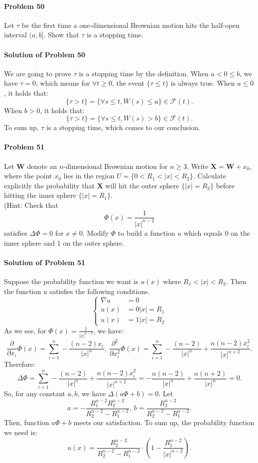 \documentclass{article}
\begin{document}
\paragraph{Problem 50} Let $\tau$ be the first time a one-dimensional Brownian motion hits the half-open interval $(a,b]$. Show that $\tau$ is a stopping time. 

\paragraph{Solution of Problem 50} We are going to prove $\tau$ is a stopping time by the definition. When $a<0\leqslant b$, we have $\tau=0$, which means for $\forall t \geqslant 0$, the event $\{\tau\leqslant t\}$ is always true. When $a\leqslant 0$, it holds that:
\[\{\tau> t\} = \{\forall s\leqslant t, W(s)\leqslant a\}\in \mathcal F(t).\]
When $b>0$, it holds that:
\[\{\tau> t\} = \{\forall s\leqslant t, W(s)>b\}\in \mathcal F(t).\]
To sum up, $\tau$ is a stopping time, which comes to our conclusion.

\paragraph{Problem 51} Let $\mathbf{W}$ denote an $n$-dimensional Brownian motion for $n\geqslant 3$. Write $\mathbf{X}=\mathbf{W}+x_0$, where the point $x_0$ lies in the region $U=\{0<R_1<|x|<R_2\}$. Calculate explicitly the probability that $\mathbf{X}$ will hit the outer sphere $\{|x|=R_2\}$ before hitting the inner sphere $\{|x|=R_1\}$. \\
(Hint: Check that
\[\Phi(x)=\frac{1}{|x|^{n-2}}\]
satisfies $\Delta\Phi=0$ for $x\neq 0$. Modify $\Phi$ to build a function $u$ which equals 0 on the inner sphere and 1 on the outer sphere. 

\paragraph{Solution of Problem 51} Suppose the probability function we want is $u(x)$ where $R_1<|x|<R_2$. Then the function $u$ satisfies the following conditions.
\begin{equation*}
\begin{cases}
\nabla u &= 0\\
u(x) &= 0 \mbox{$|x|=R_1$}\\
u(x) &= 1 \mbox{$|x|=R_2$}
\end{cases}    
\end{equation*}
As we see, for $\Phi(x)=\frac{1}{|x|^{n-2}}$, we have:
\[\frac{\partial}{\partial x_i}\Phi(x) =\sum_{i=1}^{n}-\frac{(n-2)x_i}{|x|^n},~\frac{\partial^2}{\partial x_i^2}\Phi(x) =\sum_{i=1}^{n}-\frac{(n-2)}{|x|^n}+\frac{n(n-2)x_i^2}{|x|^{n+2}}.\]
Therefore:
\[\Delta\Phi = \sum_{i=1}^{n}-\frac{(n-2)}{|x|^n}+\frac{n(n-2)x_i^2}{|x|^{n+2}} = -\frac{n(n-2)}{|x|^n}+\frac{n(n+2)}{|x|^n}=0.\]
So, for any constant $a,b$, we have $\Delta(a\Phi+b)=0$. Let 
\[a = -\frac{R_1^{n-2}R_2^{n-2}}{R_2^{n-2}-R_1^{n-2}},~b=\frac{R_2^{n-2}}{R_2^{n-2}-R_1^{n-2}}.\]
Then, function $a\Phi+b$ meets our satisfaction. To sum up, the probability function we need is:
\[u(x)=\frac{R_2^{n-2}}{R_2^{n-2}-R_1^{n-2}}\cdot\left(1-\frac{R_1^{n-2}}{|x|^{n-2}}\right).\]
\end{document}

